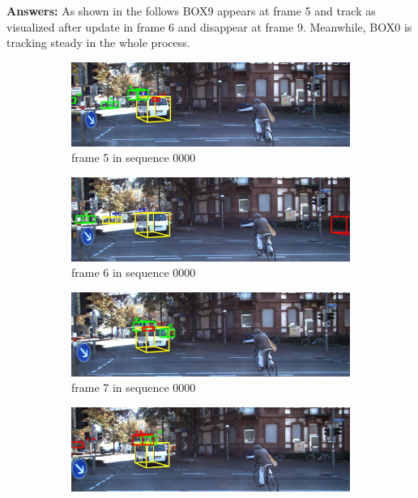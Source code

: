 \documentclass[11pt]{article}
\begin{document}
\textbf{Answers:} As shown in the follows BOX9 appears at frame 5 and track as visualized after update in frame 6 and disappear at frame 9. Meanwhile, BOX0 is tracking steady in the whole process.

\begin{figure}[h]
    \centering
    \begin{subfigure}[b]{0.4\textwidth}
      \includegraphics[width=\textwidth]{./fig/Q6_5.jpg}
      \caption{frame 5 in sequence 0000}
    \end{subfigure}
    \hfill
    \begin{subfigure}[b]{0.4\textwidth}
        \includegraphics[width=\textwidth]{./fig/Q6_6.jpg}
        \caption{frame 6 in sequence 0000}
    \end{subfigure}
    \hfill
    \begin{subfigure}[b]{0.4\textwidth}
        \includegraphics[width=\textwidth]{./fig/Q6_7.jpg}
        \caption{frame 7 in sequence 0000}
    \end{subfigure}
    \hfill
    \begin{subfigure}[b]{0.4\textwidth}
        \includegraphics[width=\textwidth]{./fig/Q6_8.jpg}

\end{subfigure}
\end{figure}
\end{document}
